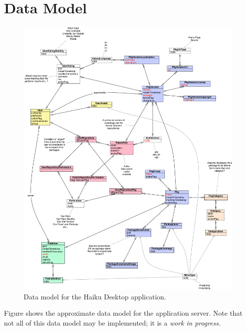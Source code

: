
\section{Data Model}

\begin{figure}
\centering
\vspace{.2in}
\includegraphics[width=6.5in]{img-datamodel.pdf}
\caption{Data model for the Haiku Desktop application.}
\label{\thefigure}
\end{figure}

Figure {\thefigure} shows the approximate data model for the application server.  Note that not all of this data model may be implemented; it is a {\it work in progress}.